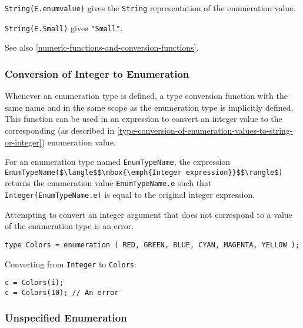 \lstinline!String(E.enumvalue)! gives the \lstinline!String! representation of the enumeration value.

\begin{example}
\lstinline!String(E.Small)! gives \lstinline!"Small"!.
\end{example}

See also \cref{numeric-functions-and-conversion-functions}.

\subsubsection{Conversion of Integer to Enumeration}\label{conversion-of-integer-to-enumeration}\label{type-conversion-of-integer-to-enumeration-values}

Whenever an enumeration type is defined, a type conversion function with the same name and in the same scope as the enumeration type is implicitly defined.
This function can be used in an expression to convert an integer value to the corresponding (as described in \cref{type-conversion-of-enumeration-values-to-string-or-integer}) enumeration value.

For an enumeration type named \lstinline!EnumTypeName!, the expression \lstinline!EnumTypeName($\langle$$\mbox{\emph{Integer expression}}$$\rangle$)! returns the enumeration value \lstinline!EnumTypeName.e! such that \lstinline!Integer(EnumTypeName.e)! is equal to the original integer expression.

Attempting to convert an integer argument that does not correspond to a value of the enumeration type is an error.

\begin{example}
\begin{lstlisting}[language=modelica]
type Colors = enumeration ( RED, GREEN, BLUE, CYAN, MAGENTA, YELLOW );
\end{lstlisting}

Converting from \lstinline!Integer! to \lstinline!Colors!:
\begin{lstlisting}[language=modelica]
c = Colors(i);
c = Colors(10); // An error
\end{lstlisting}
\end{example}


\subsubsection{Unspecified Enumeration}\label{unspecified-enumeration}

